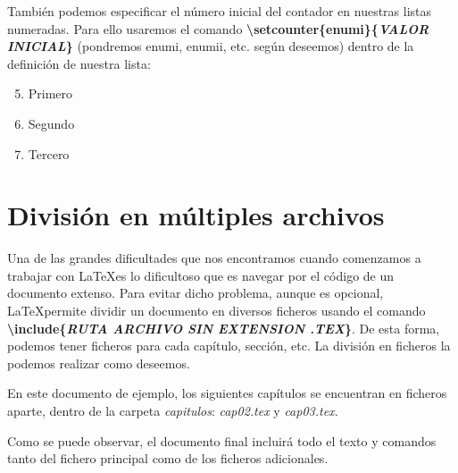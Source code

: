 \documentclass[12pt]{book} %
\begin{document}
\renewcommand\labelenumi{$\arabic{enumi}$.}

También podemos especificar el número inicial del contador en nuestras listas numeradas. Para ello usaremos el comando \textbf{\textbackslash setcounter\{enumi\}\{\emph{VALOR INICIAL}\}} (pondremos enumi, enumii, etc. según deseemos) dentro de la definición de nuestra lista:

\begin{enumerate}
\setcounter{enumi}{4} %
	\item Primero
	\item Segundo
	\item Tercero
\end{enumerate}

\section{División en múltiples archivos}

Una de las grandes dificultades que nos encontramos cuando comenzamos a trabajar con \LaTeX es lo dificultoso que es navegar por el código de un documento extenso. Para evitar dicho problema, aunque es opcional, \LaTeX permite dividir un documento en diversos ficheros usando el comando \textbf{\textbackslash include\{\emph{RUTA ARCHIVO SIN EXTENSION .TEX}\}}. De esta forma, podemos tener ficheros para cada capítulo, sección, etc. La división en ficheros la podemos realizar como deseemos.

En este documento de ejemplo, los siguientes capítulos se encuentran en ficheros aparte, dentro de la carpeta \emph{capitulos}: \emph{cap02.tex} y \emph{cap03.tex}.

Como se puede observar, el documento final incluirá todo el texto y comandos tanto del fichero principal como de los ficheros adicionales.




\end{document}
